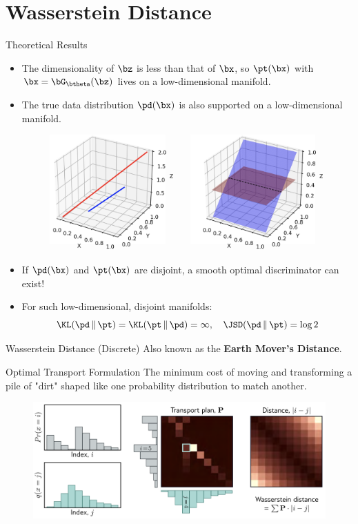 \documentclass{beamer}
\begin{document}
\section{Wasserstein Distance}
\begin{frame}{Theoretical Results}
	\vspace{-0.3cm}
	\begin{itemize}
		\item The dimensionality of $\bz$ is less than that of $\bx$, so $\pt(\bx)$ with $\bx = \bG_{\btheta}(\bz)$ lives on a low-dimensional manifold.
		\eqpause
		\item The true data distribution $\pd(\bx)$ is also supported on a low-dimensional manifold.
		\begin{figure}
			\centering
			\includegraphics[width=0.55\linewidth]{figs/low_dim_manifold}
		\end{figure}
		\eqpause
		\item If $\pd(\bx)$ and $\pt(\bx)$ are disjoint, a smooth optimal discriminator can exist!
		\eqpause
		\item For such low-dimensional, disjoint manifolds:
		\vspace{-0.2cm}
		\[
			\KL(\pd\,\|\,\pt) = \KL(\pt\,\|\,\pd) = \infty, \quad \JSD(\pd\,\|\,\pt) = \log 2
		\]
	\end{itemize}
\end{frame}
\begin{frame}{Wasserstein Distance (Discrete)}
	Also known as the \textbf{Earth Mover's Distance}.
	\begin{block}{Optimal Transport Formulation}
		The minimum cost of moving and transforming a pile of "dirt" shaped like one probability distribution to match another.
	\end{block}
	\begin{figure}
		\centering
		\includegraphics[width=\linewidth]{figs/discrete_wasserstein}
	\end{figure}
\end{frame}
\end{document}

